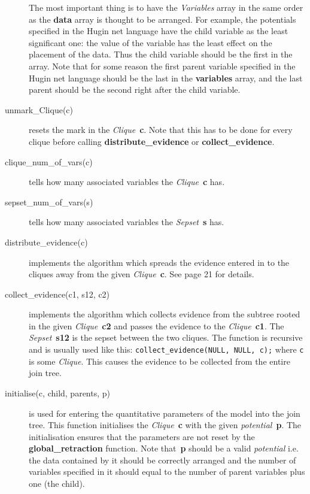\documentclass[12pt,a4paper]{report}
\begin{document}
\begin{description}
The most important thing is to have the {\it Variables} array in the 
same order as the \textbf{data} array is thought to be arranged. 
For example, the potentials specified in the Hugin net language have 
the child variable as the least significant one: the value of the variable 
has the least effect on the placement of the data. Thus the child
variable should be the first in the array. Note that for some reason 
the first parent variable specified in the Hugin net language should be 
the last in the \textbf{variables} array, and the last parent should
be the second right after the child variable.
\item[unmark\_Clique(c)] resets the mark in the {\it
Clique}~\textbf{c}. Note that this has to be done for every clique 
before calling \textbf{distribute\_evidence} or 
\textbf{collect\_evidence}.
\item[clique\_num\_of\_vars(c)] tells how many associated variables the 
{\it Clique}~\textbf{c} has.
\item[sepset\_num\_of\_vars(s)] tells how many associated variables the 
{\it Sepset}~\textbf{s} has.
\item[distribute\_evidence(c)] implements the algorithm which spreads 
the evidence entered in to the cliques away from the given 
{\it Clique}~\textbf{c}. See \cite{huang1994} page 21 for
details. 
\item[collect\_evidence(c1, s12, c2)] implements the algorithm which 
collects evidence from the subtree rooted in the given {\it
Clique}~\textbf{c2} and passes the evidence to the {\it
Clique}~\textbf{c1}. The {\it Sepset}~\textbf{s12} is the sepset
between the two cliques. The function is recursive and is usually
used like this: \verb+collect_evidence(NULL, NULL, c);+ where \verb+c+
is some {\it Clique}. This causes the evidence to be collected from
the entire join tree.
\item[initialise(c, child, parents, p)] is used for entering the
quantitative parameters of the model into the join tree. This function
initialises the {\it Clique}~\textbf{c} with the given {\it
potential}~\textbf{p}. The initialisation ensures that the parameters
are not reset by the \textbf{global\_retraction} function. Note
that~\textbf{p} should be a valid {\it potential} i.e. the data
contained by it should be correctly arranged and the number of
variables specified in it should equal to the number of parent
variables plus one (the child).


\end{description}
\end{document}
